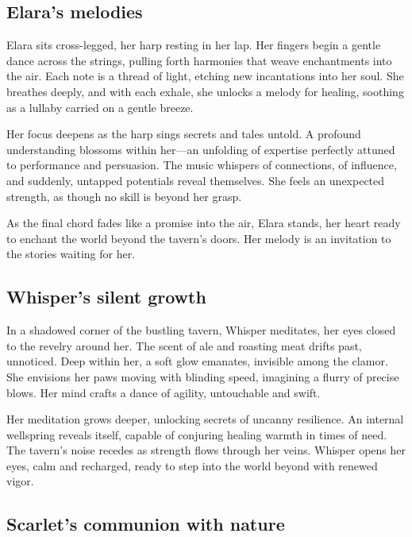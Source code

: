 \documentclass[
  letterpaper,12pt,twoside,twocolumn,openany,
  nodeprecatedcode,bg=full]{dndbook}
\begin{document}
\subsection{Elara's melodies}\label{elaras-melodies}

Elara sits cross-legged, her harp resting in her lap. Her fingers begin
a gentle dance across the strings, pulling forth harmonies that weave
enchantments into the air. Each note is a thread of light, etching new
incantations into her soul. She breathes deeply, and with each exhale,
she unlocks a melody for healing, soothing as a lullaby carried on a
gentle breeze.

Her focus deepens as the harp sings secrets and tales untold. A profound
understanding blossoms within her---an unfolding of expertise perfectly
attuned to performance and persuasion. The music whispers of
connections, of influence, and suddenly, untapped potentials reveal
themselves. She feels an unexpected strength, as though no skill is
beyond her grasp.

As the final chord fades like a promise into the air, Elara stands, her
heart ready to enchant the world beyond the tavern's doors. Her melody
is an invitation to the stories waiting for her.

\subsection{Whisper's silent growth}\label{whispers-silent-growth}

In a shadowed corner of the bustling tavern, Whisper meditates, her eyes
closed to the revelry around her. The scent of ale and roasting meat
drifts past, unnoticed. Deep within her, a soft glow emanates, invisible
among the clamor. She envisions her paws moving with blinding speed,
imagining a flurry of precise blows. Her mind crafts a dance of agility,
untouchable and swift.

Her meditation grows deeper, unlocking secrets of uncanny resilience. An
internal wellspring reveals itself, capable of conjuring healing warmth
in times of need. The tavern's noise recedes as strength flows through
her veins. Whisper opens her eyes, calm and recharged, ready to step
into the world beyond with renewed vigor.

\subsection{Scarlet's communion with
nature}\label{scarlets-communion-with-nature}
\end{document}
